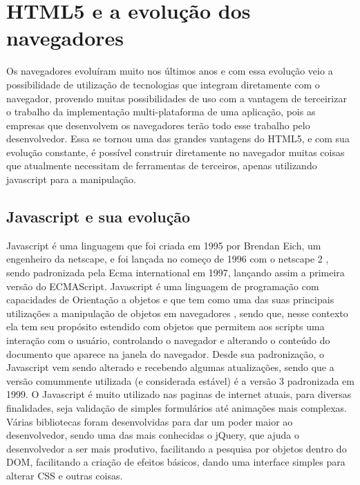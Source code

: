 \section{HTML5 e a evolução dos navegadores}


Os navegadores evoluíram muito nos últimos anos e com essa evolução
veio a possibilidade de utilização de tecnologias que integram
diretamente com o navegador, provendo muitas possibilidades de uso com
a vantagem de terceirizar o trabalho da implementação multi-plataforma
de uma aplicação, pois as empresas que desenvolvem os navegadores
terão todo esse trabalho pelo desenvolvedor. Essa se tornou uma das
grandes vantagens do HTML5, e com sua evolução constante, é possível
construir diretamente no navegador muitas coisas que atualmente necessitam
de ferramentas de terceiros, apenas utilizando javascript para a
manipulação.

\subsection{Javascript e sua evolução}

Javascript é uma linguagem que foi criada em 1995 por Brendan Eich,
um engenheiro da netscape, e foi lançada no começo de 1996 com o
netscape 2 \cite{mdnjavascript}, sendo padronizada pela Ecma
international em 1997, lançando assim a primeira versão do ECMAScript.
Javascript é uma linguagem de programação com capacidades de Orientação a objetos e que tem como uma das suas principais
utilizações a manipulação de objetos em navegadores \cite{flanagan2006javascript}, sendo que, nesse contexto
ela tem seu propósito estendido com objetos que permitem aos scripts uma interação com o usuário,
controlando o navegador e alterando o conteúdo do documento que aparece na janela do navegador.
Desde sua padronização, o Javascript vem sendo alterado e
recebendo algumas atualizações, sendo que a versão comummente
utilizada (e considerada estável) é a versão 3 padronizada em 1999.
O Javascript é muito utilizado nas paginas de internet atuais, para
diversas finalidades, seja validação de simples formulários até
animações mais complexas. Várias bibliotecas foram desenvolvidas para
dar um poder maior ao desenvolvedor, sendo uma das mais conhecidas o
jQuery, que ajuda o desenvolvedor a ser mais produtivo, facilitando a
pesquisa por objetos dentro do DOM, facilitando a criação de efeitos
básicos, dando uma interface simples para alterar CSS e outras coisas.

